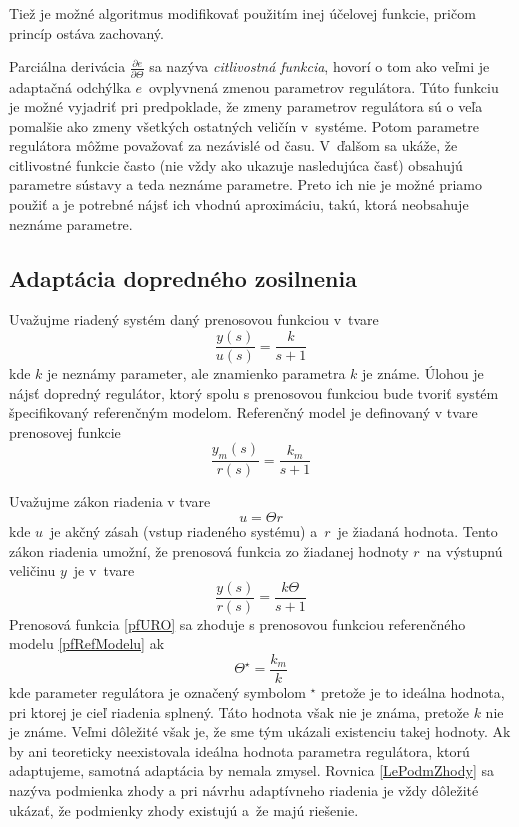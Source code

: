 \documentclass[a4paper, 10pt, ]{article}
\begin{document}
Tiež je možné algoritmus modifikovať použitím inej účelovej funkcie, pričom princíp ostáva zachovaný.

Parciálna derivácia $\frac{\partial e}{\partial \Theta}$ sa nazýva \emph{citlivostná funkcia}, hovorí o tom ako veľmi je adaptačná odchýlka $e$~ovplyvnená zmenou parametrov regulátora. Túto funkciu je možné vyjadriť pri predpoklade, že zmeny parametrov regulátora sú o veľa pomalšie ako zmeny všetkých ostatných veličín v~systéme. Potom parametre regulátora môžme považovať za nezávislé od času. V~ďalšom sa ukáže, že citlivostné funkcie často (nie vždy ako ukazuje nasledujúca časť) obsahujú parametre sústavy a teda neznáme parametre. Preto ich nie je možné priamo použiť a je potrebné nájsť ich vhodnú aproximáciu, takú, ktorá neobsahuje neznáme parametre.






\subsection{Adaptácia dopredného zosilnenia}

Uvažujme riadený systém daný prenosovou funkciou v~tvare
\begin{equation}
	\frac{y(s)}{u(s)} = \frac{k}{s + 1}
\end{equation}
kde $k$ je neznámy parameter, ale znamienko parametra $k$ je známe. Úlohou je nájsť dopredný regulátor, ktorý spolu s prenosovou funkciou bude tvoriť systém špecifikovaný referenčným modelom. Referenčný model je definovaný v tvare prenosovej funkcie
\begin{equation} \label{pfRefModelu}
	\frac{y_m(s)}{r(s)} = \frac{k_m}{s + 1}
\end{equation}

Uvažujme zákon riadenia v tvare
\begin{equation}
	u = \Theta r
\end{equation}
kde $u$~je akčný zásah (vstup riadeného systému) a~$r$~je žiadaná hodnota. Tento zákon riadenia umožní, že prenosová funkcia zo žiadanej hodnoty $r$~na výstupnú veličinu $y$~je v~tvare
\begin{equation} \label{pfURO}
	\frac{y(s)}{r(s)} = \frac{k \Theta}{s + 1}
\end{equation}
Prenosová funkcia \eqref{pfURO} sa zhoduje s prenosovou funkciou referenčného modelu \eqref{pfRefModelu} ak
\begin{equation} \label{LePodmZhody}
	\Theta^\star = \frac{k_m}{k}
\end{equation}
kde parameter regulátora je označený symbolom $^\star$ pretože je to ideálna hodnota, pri ktorej je cieľ riadenia splnený. Táto hodnota však nie je známa, pretože $k$ nie je známe. Veľmi dôležité však je, že sme tým ukázali existenciu takej hodnoty. Ak by ani teoreticky neexistovala ideálna hodnota parametra regulátora, ktorú adaptujeme, samotná adaptácia by nemala zmysel. Rovnica \eqref{LePodmZhody} sa nazýva podmienka zhody a pri návrhu adaptívneho riadenia je vždy dôležité ukázať, že podmienky zhody existujú a~že majú riešenie.
\end{document}
